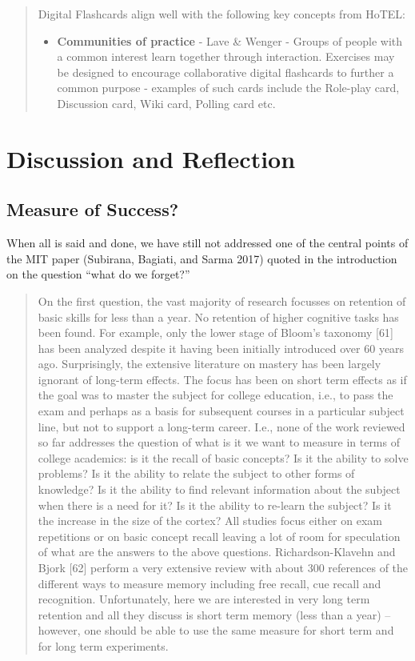 \begin{quote}
Digital Flashcards align well with the following key concepts from
HoTEL:

\begin{itemize}
\tightlist
\item
  \textbf{Communities of practice} - Lave \& Wenger - Groups of people
  with a common interest learn together through interaction. Exercises
  may be designed to encourage collaborative digital flashcards to
  further a common purpose - examples of such cards include the
  Role-play card, Discussion card, Wiki card, Polling card etc.
\end{itemize}
\end{quote}

\section{Discussion and Reflection}\label{discussion-and-reflection}

\subsection{Measure of Success?}\label{measure-of-success}

When all is said and done, we have still not addressed one of the
central points of the MIT paper (Subirana, Bagiati, and Sarma 2017)
quoted in the introduction on the question ``what do we forget?''

\begin{quote}
On the first question, the vast majority of research focusses on
retention of basic skills for less than a year. No retention of higher
cognitive tasks has been found. For example, only the lower stage of
Bloom's taxonomy {[}61{]} has been analyzed despite it having been
initially introduced over 60 years ago. Surprisingly, the extensive
literature on mastery has been largely ignorant of long-term effects.
The focus has been on short term effects as if the goal was to master
the subject for college education, i.e., to pass the exam and perhaps as
a basis for subsequent courses in a particular subject line, but not to
support a long-term career. I.e., none of the work reviewed so far
addresses the question of what is it we want to measure in terms of
college academics: is it the recall of basic concepts? Is it the ability
to solve problems? Is it the ability to relate the subject to other
forms of knowledge? Is it the ability to find relevant information about
the subject when there is a need for it? Is it the ability to re-learn
the subject? Is it the increase in the size of the cortex? All studies
focus either on exam repetitions or on basic concept recall leaving a
lot of room for speculation of what are the answers to the above
questions. Richardson-Klavehn and Bjork {[}62{]} perform a very
extensive review with about 300 references of the different ways to
measure memory including free recall, cue recall and recognition.
Unfortunately, here we are interested in very long term retention and
all they discuss is short term memory (less than a year) -- however, one
should be able to use the same measure for short term and for long term
experiments.
\end{quote}

